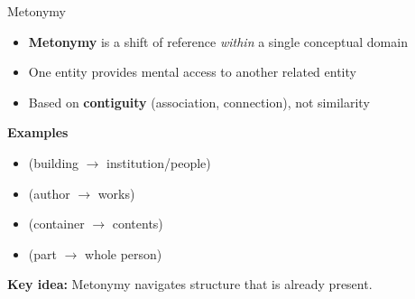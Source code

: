 \begin{frame}{Metonymy}

\begin{itemize}
  \item \textbf{Metonymy} is a shift of reference \emph{within} a single conceptual domain
  \item One entity provides mental access to another related entity
  \item Based on \textbf{contiguity} (association, connection), not similarity
\end{itemize}

\vspace{0.5em}

\textbf{Examples}
\begin{itemize}
  \item {}  
        (building $\rightarrow$ institution/people)
  \item {}  
        (author $\rightarrow$ works)
  \item {} 
        (container $\rightarrow$ contents)
  \item {}
        (part $\rightarrow$ whole person)
\end{itemize}

\vspace{0.5em}

\textbf{Key idea:}  
Metonymy navigates structure that is already present.

\end{frame}

